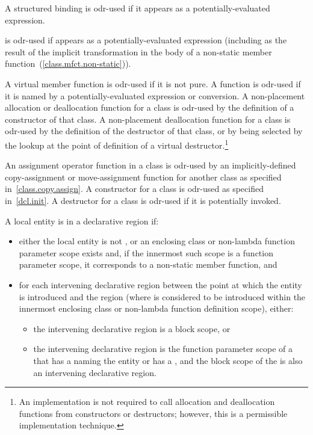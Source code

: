 \pnum
A structured binding is odr-used if it appears as a potentially-evaluated expression.

\pnum
{} is odr-used if  appears as a potentially-evaluated expression
(including as the result of the implicit transformation in the body of a non-static
member function~(\ref{class.mfct.non-static})).

\pnum
A virtual member
function is odr-used if it is not pure.
A function is odr-used if it is named by
a potentially-evaluated expression or conversion.
A non-placement allocation or deallocation
function for a class is odr-used by the definition of a constructor of that
class. A non-placement deallocation function for a class is odr-used by the
definition of the destructor of that class, or by being selected by the
lookup at the point of definition of a virtual
destructor.\footnote{An implementation is not required
to call allocation and
deallocation functions from constructors or destructors; however, this
is a permissible implementation technique.}

\pnum
An assignment operator function in a class is odr-used by an
implicitly-defined
copy-assignment or move-assignment function for another class as specified
in~\ref{class.copy.assign}.
A constructor for a class is odr-used as specified
in~\ref{dcl.init}. A destructor for a class is odr-used if it is potentially
invoked.

\pnum
A local entity
is  in a declarative region if:

\begin{itemize}
\item either the local entity is not , or
an enclosing class or non-lambda function parameter scope exists and,
if the innermost such scope is a function parameter scope,
it corresponds to a non-static member function, and
\item
for each intervening declarative region
between the point at which the entity is introduced and the region
(where  is considered to be introduced
within the innermost enclosing class or non-lambda function definition scope),
either:
\begin{itemize}
\item the intervening declarative region is a block scope, or
\item the intervening declarative region is the function parameter scope of a 
that has a 
naming the entity or has a , and
the block scope of the 
is also an intervening declarative region.
\end{itemize}
\end{itemize}

